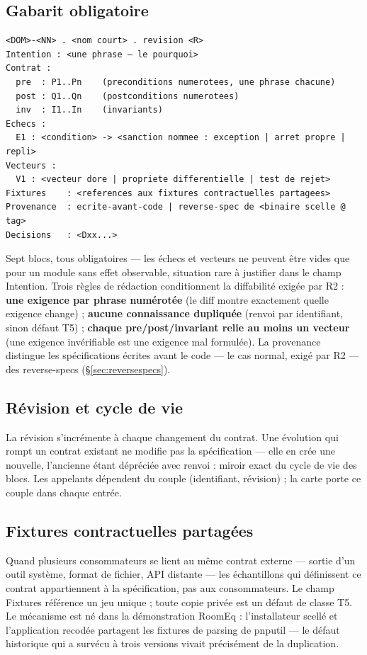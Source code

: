\subsection{Gabarit obligatoire}

\begin{lstlisting}
<DOM>-<NN> . <nom court> . revision <R>
Intention : <une phrase — le pourquoi>
Contrat :
  pre  : P1..Pn    (preconditions numerotees, une phrase chacune)
  post : Q1..Qn    (postconditions numerotees)
  inv  : I1..In    (invariants)
Echecs :
  E1 : <condition> -> <sanction nommee : exception | arret propre | repli>
Vecteurs :
  V1 : <vecteur dore | propriete differentielle | test de rejet>
Fixtures    : <references aux fixtures contractuelles partagees>
Provenance  : ecrite-avant-code | reverse-spec de <binaire scelle @ tag>
Decisions   : <Dxx...>
\end{lstlisting}

Sept blocs, tous obligatoires — les échecs et vecteurs ne peuvent être vides que pour un
module sans effet observable, situation rare à justifier dans le champ Intention. Trois
règles de rédaction conditionnent la diffabilité exigée par R2 : \textbf{une exigence par
phrase numérotée} (le diff montre exactement quelle exigence change) ; \textbf{aucune
connaissance dupliquée} (renvoi par identifiant, sinon défaut T5) ; \textbf{chaque
pre/post/invariant relie au moins un vecteur} (une exigence invérifiable est une exigence
mal formulée). La provenance distingue les spécifications écrites avant le code — le cas
normal, exigé par R2 — des reverse-specs (§\ref{sec:reversespecs}).

\subsection{Révision et cycle de vie}

La révision s’incrémente à chaque changement du contrat. Une évolution qui rompt un
contrat existant ne modifie pas la spécification — elle en crée une nouvelle, l’ancienne
étant dépréciée avec renvoi : miroir exact du cycle de vie des blocs. Les appelants
dépendent du couple (identifiant, révision) ; la carte porte ce couple dans chaque entrée.

\subsection{Fixtures contractuelles partagées}

Quand plusieurs consommateurs se lient au même contrat externe — sortie d’un outil
système, format de fichier, API distante — les échantillons qui définissent ce contrat
appartiennent à la spécification, pas aux consommateurs. Le champ Fixtures référence un
jeu unique ; toute copie privée est un défaut de classe T5. Le mécanisme est né dans la
démonstration RoomEq : l’installateur scellé et l’application recodée partagent les
fixtures de parsing de pnputil — le défaut historique qui a survécu à trois versions
vivait précisément de la duplication.

